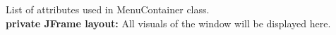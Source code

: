 \documentclass[12pt]{article} %
\begin{document}
List of attributes used in MenuContainer class.\\
\textbf{private JFrame layout:} All visuals of the window will be displayed here.\\





\pagebreak
\begin{thebibliography}{99} %

 
\end{thebibliography}

\end{document}
